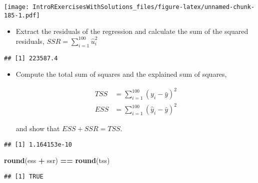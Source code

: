 \documentclass[]{article}
\newenvironment{Shaded}{\begin{snugshade}}{\end{snugshade}}
\newcommand{\KeywordTok}[1]{\textcolor[rgb]{0.13,0.29,0.53}{\textbf{#1}}}
\newcommand{\DecValTok}[1]{\textcolor[rgb]{0.00,0.00,0.81}{#1}}
\newcommand{\StringTok}[1]{\textcolor[rgb]{0.31,0.60,0.02}{#1}}
\newcommand{\CommentTok}[1]{\textcolor[rgb]{0.56,0.35,0.01}{\textit{#1}}}
\newcommand{\OperatorTok}[1]{\textcolor[rgb]{0.81,0.36,0.00}{\textbf{#1}}}
\newcommand{\NormalTok}[1]{#1}
\providecommand{\tightlist}{%
  \setlength{\itemsep}{0pt}\setlength{\parskip}{0pt}}
\begin{document}
\texttt{[image: IntroRExercisesWithSolutions\_files/figure-latex/unnamed-chunk-185-1.pdf]}

\begin{itemize}
\tightlist
\item
  Extract the residuals of the regression and calculate the sum of the
  squared residuals, \(SSR=\sum_{i=1}^{100}\hat{u}_{i}^{2}\)
\end{itemize}

\begin{Shaded}
\end{Shaded}

\begin{verbatim}
## [1] 223587.4
\end{verbatim}

\begin{itemize}
\tightlist
\item
  Compute the total sum of squares and the explained sum of squares,

  \begin{align*}
  TSS &=\sum_{i=1}^{100}\left( y_{i}-\bar{y}\right) ^{2} \\
  ESS &=\sum_{i=1}^{100}\left( \hat{y}_{i}-\bar{y}\right) ^{2}
  \end{align*}

  and show that \(ESS+SSR=TSS\).
\end{itemize}

\begin{Shaded}
\end{Shaded}

\begin{verbatim}
## [1] 1.164153e-10
\end{verbatim}

\begin{Shaded}
\begin{Highlighting}[]
\KeywordTok{round}\NormalTok{(ess }\OperatorTok{+}\StringTok{ }\NormalTok{ssr) }\OperatorTok{==}\StringTok{ }\KeywordTok{round}\NormalTok{(tss)}
\end{Highlighting}
\end{Shaded}

\begin{verbatim}
## [1] TRUE
\end{verbatim}
\end{document}
